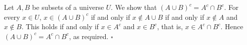 Let $A, B$ be subsets of a universe $U$.
We show that $(A \cup B)^{c} = A^{c} \cap B^{c}$.
For every $x \in U$, $x \in (A \cup B)^{c}$ if and only if $x \notin A \cup B$ if and only if $x \notin A$ and $x \notin B$.
This holds if and only if $x \in A^{c}$ and $x \in B^{c}$, that is, $x \in A^{c} \cap B^{c}$.
Hence $(A \cup B)^{c} = A^{c} \cap B^{c}$, as required. \hfill$\square$